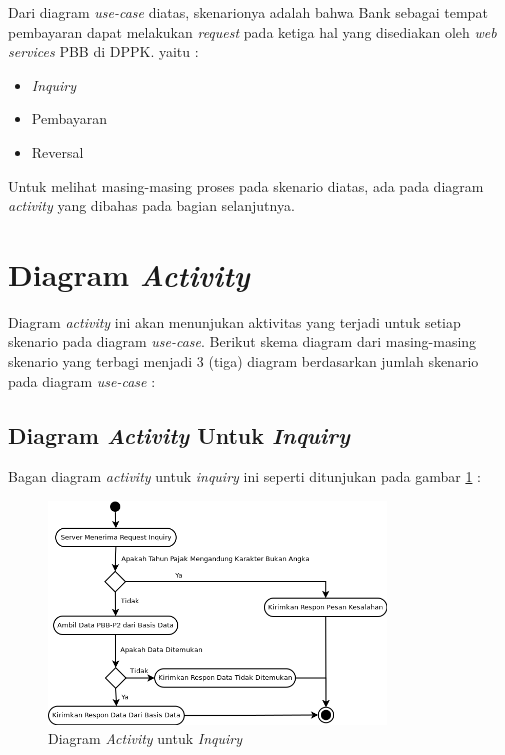 Dari diagram \textit{use-case} diatas, skenarionya adalah bahwa Bank sebagai tempat pembayaran dapat melakukan \textit{request} pada ketiga hal yang disediakan oleh \textit{web services} PBB di DPPK. yaitu :

\begin{itemize}
  \item \textit{Inquiry}
  \item Pembayaran
  \item Reversal
\end{itemize}

Untuk melihat masing-masing proses pada skenario diatas, ada pada diagram \textit{activity} yang dibahas pada bagian selanjutnya. 

\section{Diagram \textit{Activity}}

Diagram \textit{activity} ini akan menunjukan aktivitas yang terjadi untuk setiap skenario pada diagram \textit{use-case}. Berikut skema diagram dari masing-masing skenario yang terbagi menjadi 3 (tiga) diagram berdasarkan jumlah skenario pada diagram \textit{use-case} :

\subsection{Diagram \textit{Activity} Untuk \textit{Inquiry}}

Bagan diagram \textit{activity} untuk \textit{inquiry} ini seperti ditunjukan pada gambar \ref{fig:act-inquiry} :

\begin{figure}[H]
  \centering
  \includegraphics[width=0.8\textwidth]{./resources/uml/uml-act-inquiry}
  \caption{Diagram \textit{Activity} untuk \textit{Inquiry}}
  \label{fig:act-inquiry}
\end{figure}

